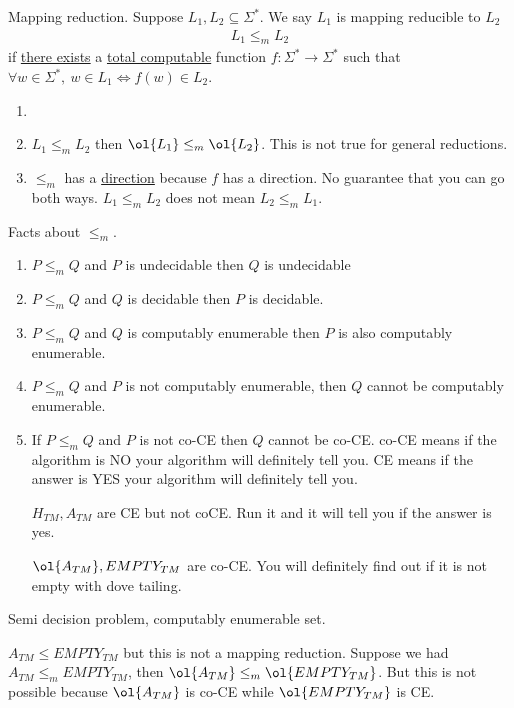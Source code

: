 \documentclass[../598comp.tex]{subfiles}
\begin{document}
Mapping reduction. Suppose $L_1, L_2 \subseteq \Sigma^*$. We say $L_1$ is
mapping reducible to $L_2$
\begin{gather*}
  L_1 \leq_m L_2
\end{gather*}
if \ul{there exists} a \ul{total computable} function $f: \Sigma^* \to
\Sigma^*$ such that $\forall w \in \Sigma^*, \ w \in L_1 \iff f(w) \in L_2$.

\begin{note}
  \begin{enumerate}
  \item[]
  \item 
    $L_1 \leq_m L_2$ then $\ol{L_1} \leq_m \ol{L_2}$. This is not true for general reductions.
  \item
    $\leq_m$ has a \ul{direction} because $f$ has a direction. No guarantee that
    you can go both ways. $L_1 \leq_m L_2$ does not mean $L_2 \leq_m L_1$.
  \end{enumerate}
\end{note}

\begin{fact}
  Facts about $\leq_m$.
  \begin{enumerate}
  \item 
    $P \leq_m Q$ and $P$ is undecidable then $Q$ is undecidable
  \item
    $P \leq_m Q$ and $Q$ is decidable then $P$ is decidable.
  \item
    $P \leq_m Q$ and $Q$ is computably enumerable then $P$ is also computably enumerable.
  \item
    $P \leq_m Q$ and $P$ is not computably enumerable, then $Q$ cannot be
    computably enumerable.
  \item
    If $P \leq_m Q$ and $P$ is not co-CE then $Q$ cannot be co-CE. co-CE means
    if the algorithm is NO your algorithm will definitely tell you. CE means if
    the answer is YES your algorithm will definitely tell you.

    $H_{TM}, A_{TM}$ are CE but not coCE. Run it and it will tell you if the
    answer is yes.

    $\ol{A_{TM}}, EMPTY_{TM}$ are co-CE. You will definitely find out if it is
    not empty with dove tailing.
  \end{enumerate}
\end{fact}
Semi decision problem, computably enumerable set.

$A_{TM} \leq EMPTY_{TM}$ but this is not a mapping reduction. Suppose we had
$A_{TM} \leq_m EMPTY_{TM}$, then $\ol{A_{TM}} \leq_m \ol{EMPTY_{TM}}$. But this
is not possible because $\ol{A_{TM}}$ is co-CE while $\ol{EMPTY_{TM}}$ is CE.
\end{document}
